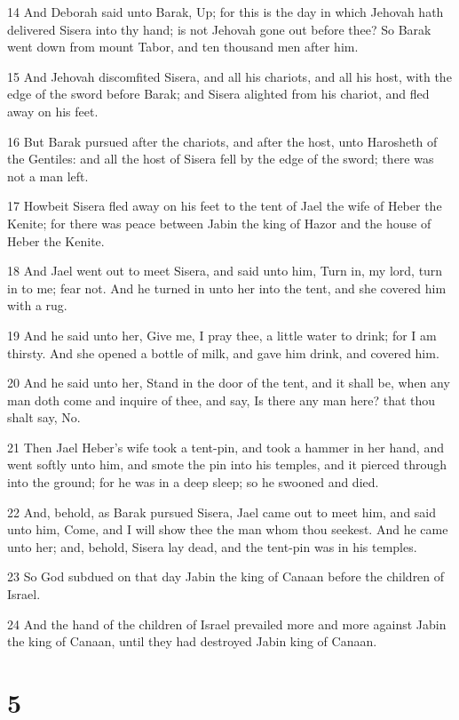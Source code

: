 \par 14 And Deborah said unto Barak, Up; for this is the day in which Jehovah hath delivered Sisera into thy hand; is not Jehovah gone out before thee? So Barak went down from mount Tabor, and ten thousand men after him.
\par 15 And Jehovah discomfited Sisera, and all his chariots, and all his host, with the edge of the sword before Barak; and Sisera alighted from his chariot, and fled away on his feet.
\par 16 But Barak pursued after the chariots, and after the host, unto Harosheth of the Gentiles: and all the host of Sisera fell by the edge of the sword; there was not a man left.
\par 17 Howbeit Sisera fled away on his feet to the tent of Jael the wife of Heber the Kenite; for there was peace between Jabin the king of Hazor and the house of Heber the Kenite.
\par 18 And Jael went out to meet Sisera, and said unto him, Turn in, my lord, turn in to me; fear not. And he turned in unto her into the tent, and she covered him with a rug.
\par 19 And he said unto her, Give me, I pray thee, a little water to drink; for I am thirsty. And she opened a bottle of milk, and gave him drink, and covered him.
\par 20 And he said unto her, Stand in the door of the tent, and it shall be, when any man doth come and inquire of thee, and say, Is there any man here? that thou shalt say, No.
\par 21 Then Jael Heber's wife took a tent-pin, and took a hammer in her hand, and went softly unto him, and smote the pin into his temples, and it pierced through into the ground; for he was in a deep sleep; so he swooned and died.
\par 22 And, behold, as Barak pursued Sisera, Jael came out to meet him, and said unto him, Come, and I will show thee the man whom thou seekest. And he came unto her; and, behold, Sisera lay dead, and the tent-pin was in his temples.
\par 23 So God subdued on that day Jabin the king of Canaan before the children of Israel.
\par 24 And the hand of the children of Israel prevailed more and more against Jabin the king of Canaan, until they had destroyed Jabin king of Canaan.

\chapter{5}

